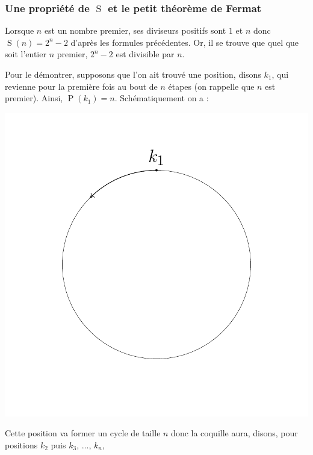\documentclass[a4paper,french,12pt]{article}
\begin{document}
\subsubsection{Une propriété de $\operatorname{S}$ et le petit théorème de Fermat}

Lorsque $n$ est un nombre premier, ses diviseurs positifs sont $1$ et $n$ donc $\operatorname{S}\left(n\right)=2^{n}-2$ d'après les formules précédentes. Or, il se trouve que quel que soit l'entier $n$ premier, $2^n - 2$ est divisible par $n$.

Pour le démontrer, supposons que l'on ait trouvé une position, disons $k_{1}$, qui revienne pour la première fois au bout de $n$ étapes (on rappelle que $n$ est premier). Ainsi, $\operatorname{P}\left(k_{1}\right)=n$. Schématiquement on a :

\begin{center}
\includegraphics[scale=0.45]{../TeXGraph/Pdf/position_periodique_1.pdf}
\end{center}

Cette position va former un cycle de taille $n$ donc la coquille aura, disons, pour positions $k_2$ puis $k_3$, $\ldots$, $k_n$,
\end{document}
